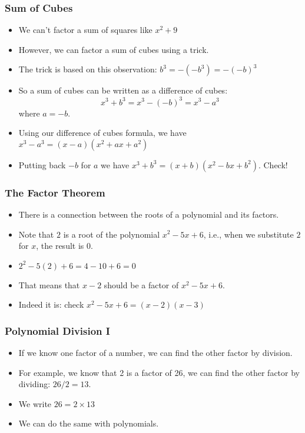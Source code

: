 \documentclass[serif,ignorenonframetext]{beamer}
\begin{document}
\begin{frame}
  \frametitle{Sum of Cubes}
  \begin{itemize}[<+->]
  \item We can't factor a sum of squares like $x^2+9$
  \item However, we can factor a sum of cubes using a trick.
  \item The trick is based on this observation: $b^3=-(-b^3)=-(-b)^3$
  \item So a sum of cubes can be written as a difference of cubes:
    \begin{equation*}
      x^3+b^3 = x^3-(-b)^3 = x^3-a^3
    \end{equation*}
    where $a = -b$.
  \item Using our difference of cubes formula, we have
    $x^3-a^3=(x-a)(x^2+ax+a^2)$
  \item Putting back $-b$ for $a$ we have
    $x^3+b^3=(x+b)(x^2-bx+b^2)$.  Check!
  \end{itemize}
\end{frame}

\begin{frame}
  \frametitle{The Factor Theorem}
  \begin{itemize}[<+->]
  \item There is a connection between the roots of a polynomial and
    its factors.
  \item Note that $2$ is a root of the polynomial $x^2-5x+6$, i.e.,
    when we substitute $2$ for $x$, the result is $0$.
  \item $2^2-5(2)+6=4-10+6=0$
  \item That means that $x-2$ should be a factor of $x^2-5x+6$.
  \item Indeed it is: check $x^2-5x+6=(x-2)(x-3)$
  \end{itemize}
\end{frame}

\begin{frame}
  \frametitle{Polynomial Division I}
  \begin{itemize}[<+->]
  \item If we know one factor of a number, we can find the other
    factor by division.
  \item For example, we know that 2 is a factor of 26, we can find the
    other factor by dividing: $26/2=13$.
  \item We write $26=2\times 13$
  \item We can do the same with polynomials.
  \end{itemize}
\end{frame}
\end{document}
